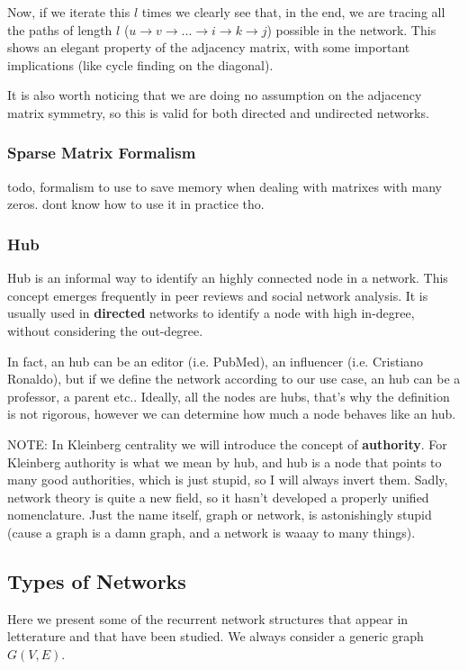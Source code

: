 \documentclass[12pt,a4paper]{article}
\begin{document}
Now, if we iterate this $l$ times we clearly see that, in the end, we are tracing all the paths of length $l$ ($u\rightarrow v \rightarrow ... \rightarrow i\rightarrow k \rightarrow j$) possible in the network. This shows an elegant property of the adjacency matrix, with some important implications (like cycle finding on the diagonal).

It is also worth noticing that we are doing no assumption on the adjacency matrix symmetry, so this is valid for both directed and undirected networks.

\subsubsection*{Sparse Matrix Formalism}
todo, formalism to use to save memory when dealing with matrixes with many zeros. dont know how to use it in practice tho.

\subsubsection*{Hub}
Hub is an informal way to identify an highly connected node in a network. This concept emerges frequently in peer reviews and social network analysis. It is usually used in \textbf{directed} networks to identify a node with high in-degree, without considering the out-degree.

In fact, an hub can be an editor (i.e. PubMed), an influencer (i.e. Cristiano Ronaldo), but if we define the network according to our use case, an hub can be a professor, a parent etc.. Ideally, all the nodes are hubs, that's why the definition is not rigorous, however we can determine how much a node behaves like an hub.

NOTE: In Kleinberg centrality we will introduce the concept of \textbf{authority}. For Kleinberg authority is what we mean by hub, and hub is a node that points to many good authorities, which is just stupid, so I will always invert them. 
Sadly, network theory is quite a new field, so it hasn't developed a properly unified nomenclature. Just the name itself, graph or network, is astonishingly stupid (cause a graph is a damn graph, and a network is waaay to many things).



\subsection{Types of Networks}
Here we present some of the recurrent network structures that appear in letterature and that have been studied. We always consider a generic graph $G(V,E)$.
\end{document}
